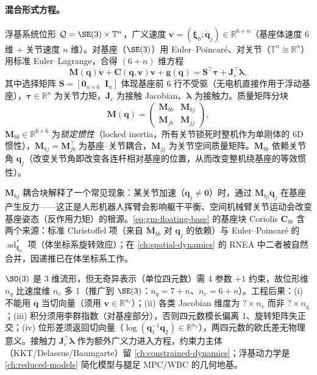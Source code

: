 \paragraph{混合形式方程。}
浮基系统位形 $\mathcal Q=\SE(3)\times\mathbb T^n$，广义速度 $\mathbf v=(\boldsymbol\xi_b;\dot{\mathbf q}_j)\in\mathbb R^{6+n}$（基座体速度 $6$ 维 $+$ 关节速度 $n$ 维）。对基座（$\SE(3)$）用 Euler--Poincaré、对关节（$\mathbb T^n\cong\mathbb R^n$）用标准 Euler--Lagrange，合得 $(6+n)$ 维方程
\begin{equation}
  \mathbf M(\mathbf q)\dot{\mathbf v}+\mathbf C(\mathbf q,\mathbf v)\mathbf v+\mathbf g(\mathbf q)=\mathbf S^\top\boldsymbol\tau+\mathbf J_c^\top\boldsymbol\lambda,
  \label{eq:gm-floating-base}
\end{equation}
其中选择矩阵 $\mathbf S=[\mathbf 0_{n\times6}\;\;\mathbf I_n]$ 体现基座前 6 行不受驱（无电机直接作用于浮动基座），$\boldsymbol\tau\in\mathbb R^n$ 为关节力矩，$\mathbf J_c$ 为接触 Jacobian、$\boldsymbol\lambda$ 为接触力。质量矩阵分块
\begin{equation}
  \mathbf M(\mathbf q)=\begin{pmatrix}\mathbf M_{bb} & \mathbf M_{bj}\\ \mathbf M_{jb} & \mathbf M_{jj}\end{pmatrix},
  \label{eq:gm-M-block}
\end{equation}
$\mathbf M_{bb}\in\mathbb R^{6\times6}$ 为\emph{锁定惯性}（locked inertia，所有关节锁死时整机作为单刚体的 $6$D 惯性），$\mathbf M_{bj}=\mathbf M_{jb}^\top$ 为基座--关节耦合，$\mathbf M_{jj}$ 为关节空间质量矩阵。$\mathbf M_{bb}$ 依赖关节角 $\mathbf q_j$（改变关节角即改变各连杆相对基座的位置，从而改变整机绕基座的等效惯性）。

\begin{insight}
$\mathbf M_{bj}$ 耦合块解释了一个常见现象：某关节加速（$\ddot{\mathbf q}_j\ne\mathbf0$）时，通过 $\mathbf M_{bj}\ddot{\mathbf q}_j$ 在基座产生反力——这正是人形机器人挥臂会影响躯干平衡、空间机械臂关节运动会改变基座姿态（反作用力矩）的根源。\cref{eq:gm-floating-base} 的基座块 Coriolis $\mathbf C_{bb}$ 含两个来源：标准 Christoffel 项（来自 $\dot{\mathbf M}_{bb}$ 对 $\mathbf q_j$ 的依赖）与 Euler--Poincaré 的 $\operatorname{ad}^*_{\boldsymbol\xi_b}$ 项（体坐标系旋转效应）；在 \cref{ch:spatial-dynamics} 的 RNEA 中二者被自然合并，因递推已在体坐标系工作。
\end{insight}

\begin{remark}[$n_q\ne n_v$ 的深层原因与工程影响]
$\SO(3)$ 是 3 维流形，但无奇异表示（单位四元数）需 4 参数 $+1$ 约束，故位形维 $n_q$ 比速度维 $n_v$ 多 1（推广到 $\SE(3)$：$n_q=7+n$、$n_v=6+n$）。工程后果：(i) 不能用 $\dot{\mathbf q}$ 当切向量（须用 $\mathbf v\in\mathbb R^{n_v}$）；(ii) 各类 Jacobian 维度为 $?\times n_v$ 而非 $?\times n_q$；(iii) 积分须用李群指数（对基座部分），否则四元数模长偏离 1、旋转矩阵失正交；(iv) 位形差须返回切向量（$\log(\mathbf q_1^{-1}\mathbf q_2)\in\mathbb R^{n_v}$），两四元数的欧氏差无物理意义。接触力 $\mathbf J_c^\top\boldsymbol\lambda$ 作为额外广义力进入方程，约束力主体（KKT/Delassus/Baumgarte）留 \cref{ch:constrained-dynamics}；浮基动力学是 \cref{ch:reduced-models} 简化模型与腿足 MPC/WBC 的几何地基。
\end{remark}

